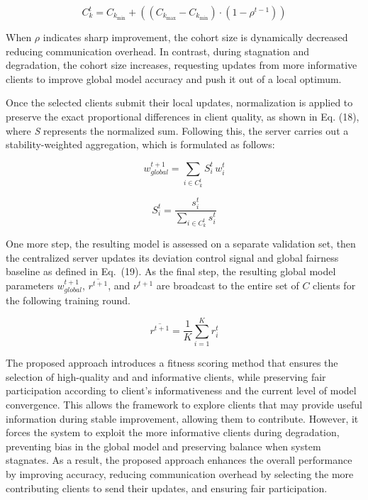 \documentclass[pdflatex,sn-mathphys-num,oneside]{sn-jnl}%
\theoremstyle{thmstyleone}%
\theoremstyle{thmstyletwo}%
\theoremstyle{thmstylethree}%
\begin{document}
\begin{equation}
C_k^t = C_{k_{\min}} + \left( (C_{k_{\max}} - C_{k_{\min}})\cdot (1 - \rho^{t-1}) \right)
\label{eq:ck_selection}
\end{equation}

When $\rho$ indicates sharp improvement, the cohort size is dynamically decreased reducing communication overhead. In contrast, during stagnation and degradation, the cohort size increases, requesting updates from more informative clients to improve global model accuracy and push it out of a local optimum.

Once the selected clients submit their local updates, normalization is applied to preserve the exact proportional differences in client quality, as shown in Eq. (18), where \textit{S} represents the normalized sum. Following this, the server carries out a stability-weighted aggregation, which is formulated as follows:

\begin{equation}
w_{{global}}^{t+1} = \sum_{i \in C_k^t} S_i^t \, w_i^t
\label{eq:stability_weighted_update}
\end{equation}

\begin{equation}
S_i^t = \frac{s_i^t}{\sum_{i \in C_k^t} s_i^t}
\label{eq:stability_norm}
\end{equation}

One more step, the resulting model is assessed on a separate validation set, then the centralized server updates its deviation control signal and global fairness baseline as defined in Eq.~(19). As the final step, the resulting global model parameters $w_{{global}}^{t+1}$, $\overline{r^{t+1}}$, and $\nu^{t+1}$ are broadcast to the entire set of $C$ clients for the following training round.

\begin{equation}
\overline{r^{t+1}} = \frac{1}{K} \sum_{i=1}^{K} r_i^t
\label{eq:avg_idle_correct}
\end{equation}

The proposed approach introduces a fitness scoring method that ensures the selection of high-quality and and informative clients, while preserving fair participation according to client’s informativeness and the current level of model convergence. This allows the framework to explore clients that may provide useful information during stable improvement, allowing them to contribute. However, it forces the system to exploit the more informative clients during degradation, preventing bias in the global model and preserving balance when system stagnates. As a result, the proposed approach enhances the overall performance by improving accuracy, reducing communication overhead by selecting the more contributing clients to send their updates, and ensuring fair participation. 
\end{document}

